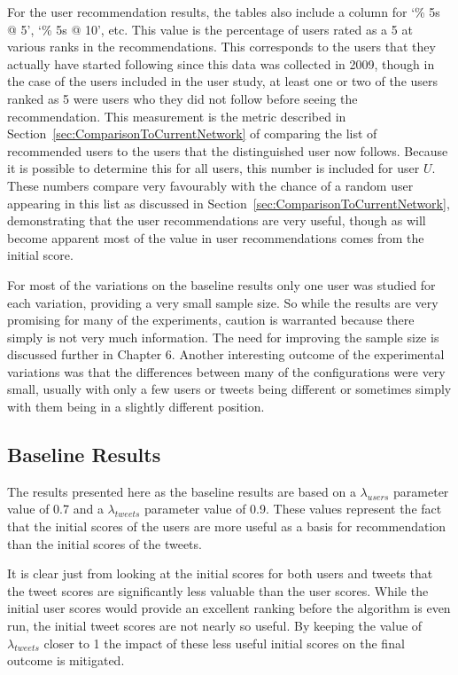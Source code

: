 For the user recommendation results, the tables also include a column for `\% 5s @ 5', `\% 5s @ 10', etc. This value is the percentage of users rated as a 5 at various ranks in the recommendations. This corresponds to the users that they actually have started following since this data was collected in 2009, though in the case of the users included in the user study, at least one or two of the users ranked as 5 were users who they did not follow before seeing the recommendation. This measurement is the metric described in Section~\ref{sec:ComparisonToCurrentNetwork} of comparing the list of recommended users to the users that the distinguished user now follows. Because it is possible to determine this for all users, this number is included for user $U$. These numbers compare very favourably with the chance of a random user appearing in this list as discussed in Section~\ref{sec:ComparisonToCurrentNetwork}, demonstrating that the user recommendations are very useful, though as will become apparent most of the value in user recommendations comes from the initial score.

For most of the variations on the baseline results only one user was studied for each variation, providing a very small sample size. So while the results are very promising for many of the experiments, caution is warranted because there simply is not very much information. The need for improving the sample size is discussed further in Chapter 6. Another interesting outcome of the experimental variations was that the differences between many of the configurations were very small, usually with only a few users or tweets being different or sometimes simply with them being in a slightly different position.

\subsection{Baseline Results}
\label{sec:BaselineResults}

The results presented here as the baseline results are based on a $\lambda_{users}$ parameter value of 0.7 and a $\lambda_{tweets}$ parameter value of 0.9. These values represent the fact that the initial scores of the users are more useful as a basis for recommendation than the initial scores of the tweets.

It is clear just from looking at the initial scores for both users and tweets that the tweet scores are significantly less valuable than the user scores. While the initial user scores would provide an excellent ranking before the algorithm is even run, the initial tweet scores are not nearly so useful. By keeping the value of $\lambda_{tweets}$ closer to 1 the impact of these less useful initial scores on the final outcome is mitigated.

